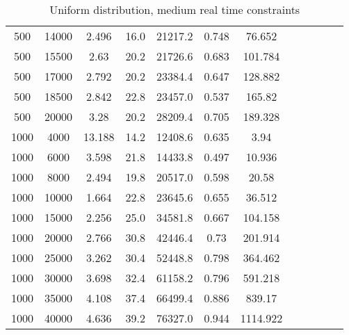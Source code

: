 \begin{table}[htb]
\begin{tabular}{|c|c|c|c|c|c|c|c|c|c|c|c|}
		500 & 14000 & 2.496 & 16.0 & 21217.2 & 0.748 & 76.652 & & & & &  \\ 
		500 & 15500 & 2.63 & 20.2 & 21726.6 & 0.683 & 101.784 & & & & &  \\ 
		500 & 17000 & 2.792 & 20.2 & 23384.4 & 0.647 & 128.882 & & & & &  \\ 
		500 & 18500 & 2.842 & 22.8 & 23457.0 & 0.537 & 165.82 & & & & &  \\ 
		500 & 20000 & 3.28 & 20.2 & 28209.4 & 0.705 & 189.328 & & & & &  \\ 
		1000 & 4000 & 13.188 & 14.2 & 12408.6 & 0.635 & 3.94 & & & & &  \\ 
		1000 & 6000 & 3.598 & 21.8 & 14433.8 & 0.497 & 10.936 & & & & &  \\ 
		1000 & 8000 & 2.494 & 19.8 & 20517.0 & 0.598 & 20.58 & & & & &  \\ 
		1000 & 10000 & 1.664 & 22.8 & 23645.6 & 0.655 & 36.512 & & & & &  \\ 
		1000 & 15000 & 2.256 & 25.0 & 34581.8 & 0.667 & 104.158 & & & & &  \\ 
		1000 & 20000 & 2.766 & 30.8 & 42446.4 & 0.73 & 201.914 & & & & &  \\ 
		1000 & 25000 & 3.262 & 30.4 & 52448.8 & 0.798 & 364.462 & & & & &  \\ 
		1000 & 30000 & 3.698 & 32.4 & 61158.2 & 0.796 & 591.218 & & & & &  \\ 
		1000 & 35000 & 4.108 & 37.4 & 66499.4 & 0.886 & 839.17 & & & & &  \\ 
		1000 & 40000 & 4.636 & 39.2 & 76327.0 & 0.944 & 1114.922 & & & & &  \\ 
		\hline 
	\end{tabular} 
	\caption{Uniform distribution, medium real time constraints} 
	\label{tab:unif_medium} 
\end{table} 

